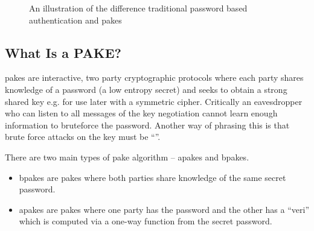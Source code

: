 \begin{figure}[H]
  \centering

  \caption{An illustration of the difference traditional password based authentication and \glspl{pake}}
  \label{fig:tls-vs-pake}
\end{figure}

\clearpage
\subsection{What Is a PAKE?}
\glspl{pake} are interactive, two party cryptographic protocols where each party shares knowledge of a password (a low entropy secret) and seeks to obtain a strong shared key e.g. for use later with a symmetric cipher. Critically an eavesdropper who can listen to all messages of the key negotiation cannot learn enough information to bruteforce the password. Another way of phrasing this is that brute force attacks on the key must be \enquote{}.

There are two main types of \gls{pake} algorithm -- \glspl{apake} and \glspl{bpake}.
\begin{itemize}
  \item \glspl{bpake} are \glspl{pake} where both parties share knowledge of the same secret password.
  \item \glspl{apake} are \glspl{pake} where one party has the password and the other has a \enquote{\gls{veri}} which is computed via a one-way function from the secret password.
\end{itemize}

